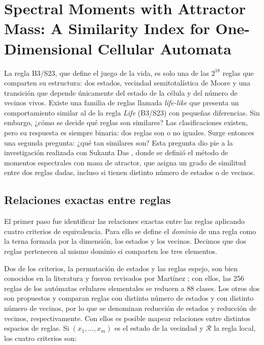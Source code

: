 \section{Spectral Moments with Attractor Mass: A Similarity Index for One-Dimensional Cellular Automata}

La regla B3/S23, que define el juego de la vida, es solo una de las $2^{18}$ reglas que comparten su estructura: dos estados, vecindad semitotalística de Moore y una transición que depende únicamente del estado de la célula y del número de vecinos vivos. Existe una familia de reglas llamada \textit{life-like} \cite{lifewiki_life} que presenta un comportamiento similar al de la regla \textit{Life} (B3/S23) con pequeñas diferencias. Sin embargo, ¿cómo se decide qué reglas son similares? Las clasificaciones existen, pero su respuesta es siempre binaria: dos reglas son o no iguales. Surge entonces una segunda pregunta: ¿qué tan similares son? Esta pregunta dio pie a la investigación realizada con Sukanta Das \cite{angeles2027spectral}, donde se definió el método de momentos espectrales con masa de atractor, que asigna un grado de similitud entre dos reglas dadas, incluso si tienen distinto número de estados o de vecinos. 

\subsection{Relaciones exactas entre reglas}

El primer paso fue identificar las relaciones exactas entre las reglas aplicando cuatro criterios de equivalencia. Para ello se define el \textit{dominio} de una regla como la terna formada por la dimensión, los estados y los vecinos. Decimos que dos reglas pertenecen al mismo dominio si comparten los tres elementos. 

Dos de los criterios, la permutación de estados y las reglas espejo, son bien conocidos en la literatura y fueron revisados por Martínez \cite{Martinez2013note}; con ellos, las 256 reglas de los autómatas celulares elementales se reducen a 88 clases. Los otros dos son propuestos y comparan reglas con distinto número de estados y con distinto número de vecinos, por lo que se denominan reducción de estados y reducción de vecinos, respectivamente. Con ellos es posible mapear relaciones entre distintos espacios de reglas. Si $(x_1, \dots, x_m)$ es el estado de la vecindad y $\mathcal{R}$ la regla local, los cuatro criterios son:

